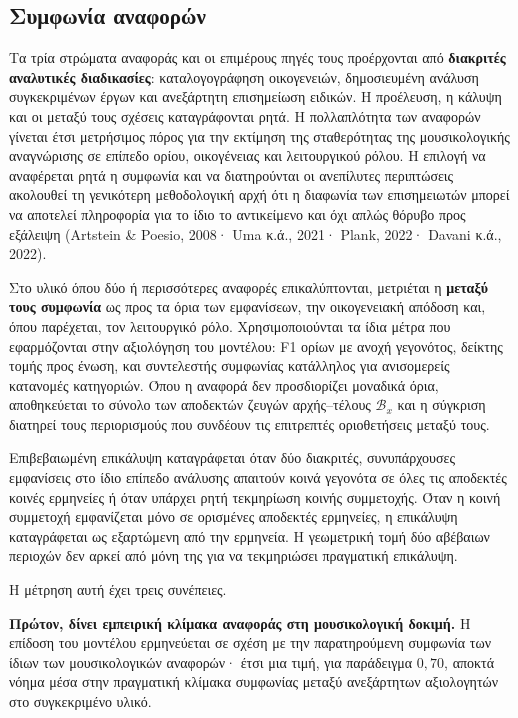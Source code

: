 \documentclass[11pt,a4paper]{article}
\begin{document}
\subsection{Συμφωνία αναφορών}\label{app:corpora-agreement}

Τα τρία στρώματα αναφοράς και οι επιμέρους πηγές τους προέρχονται από \textbf{διακριτές αναλυτικές διαδικασίες}: καταλογογράφηση οικογενειών, δημοσιευμένη ανάλυση συγκεκριμένων έργων και ανεξάρτητη επισημείωση ειδικών. Η προέλευση, η κάλυψη και οι μεταξύ τους σχέσεις καταγράφονται ρητά. Η πολλαπλότητα των αναφορών γίνεται έτσι μετρήσιμος πόρος για την εκτίμηση της σταθερότητας της μουσικολογικής αναγνώρισης σε επίπεδο ορίου, οικογένειας και λειτουργικού ρόλου. Η επιλογή να αναφέρεται ρητά η συμφωνία και να διατηρούνται οι ανεπίλυτες περιπτώσεις ακολουθεί τη γενικότερη μεθοδολογική αρχή ότι η διαφωνία των επισημειωτών μπορεί να αποτελεί πληροφορία για το ίδιο το αντικείμενο και όχι απλώς θόρυβο προς εξάλειψη (Artstein \& Poesio, 2008· Uma κ.ά., 2021· Plank, 2022· Davani κ.ά., 2022).

Στο υλικό όπου δύο ή περισσότερες αναφορές επικαλύπτονται, μετριέται η \textbf{μεταξύ τους συμφωνία} ως προς τα όρια των εμφανίσεων, την οικογενειακή απόδοση και, όπου παρέχεται, τον λειτουργικό ρόλο. Χρησιμοποιούνται τα ίδια μέτρα που εφαρμόζονται στην αξιολόγηση του μοντέλου: F1 ορίων με ανοχή γεγονότος, δείκτης τομής προς ένωση, και συντελεστής συμφωνίας κατάλληλος για ανισομερείς κατανομές κατηγοριών. Όπου η αναφορά δεν προσδιορίζει μοναδικά όρια, αποθηκεύεται το σύνολο των αποδεκτών ζευγών αρχής--τέλους $\mathcal B_x$ και η σύγκριση διατηρεί τους περιορισμούς που συνδέουν τις επιτρεπτές οριοθετήσεις μεταξύ τους.

Επιβεβαιωμένη επικάλυψη καταγράφεται όταν δύο διακριτές, συνυπάρχουσες εμφανίσεις στο ίδιο επίπεδο ανάλυσης απαιτούν κοινά γεγονότα σε όλες τις αποδεκτές κοινές ερμηνείες ή όταν υπάρχει ρητή τεκμηρίωση κοινής συμμετοχής. Όταν η κοινή συμμετοχή εμφανίζεται μόνο σε ορισμένες αποδεκτές ερμηνείες, η επικάλυψη καταγράφεται ως εξαρτώμενη από την ερμηνεία. Η γεωμετρική τομή δύο αβέβαιων περιοχών δεν αρκεί από μόνη της για να τεκμηριώσει πραγματική επικάλυψη.

Η μέτρηση αυτή έχει τρεις συνέπειες.

\textbf{Πρώτον, δίνει εμπειρική κλίμακα αναφοράς στη μουσικολογική δοκιμή.} Η επίδοση του μοντέλου ερμηνεύεται σε σχέση με την παρατηρούμενη συμφωνία των ίδιων των μουσικολογικών αναφορών· έτσι μια τιμή, για παράδειγμα \(0{,}70\), αποκτά νόημα μέσα στην πραγματική κλίμακα συμφωνίας μεταξύ ανεξάρτητων αξιολογητών στο συγκεκριμένο υλικό.
\end{document}
